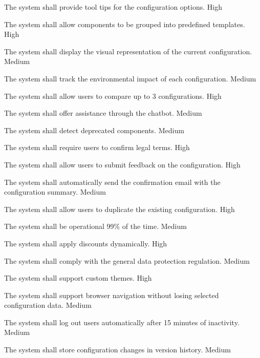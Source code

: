  {
    The system shall provide tool tips for the configuration options.
  }
  {High}

  {
    The system shall allow components to be grouped into predefined templates.
  }
  {High}

  {
    The system shall display the visual representation of the current configuration.
  }
  {Medium}

  {
    The system shall track the environmental impact of each configuration.
  }
  {Medium}

  {
    The system shall allow users to compare up to 3 configurations.
  }
  {High}

  {
    The system shall offer assistance through the chatbot.
  }
  {Medium}

  {
    The system shall detect deprecated components.
  }
  {Medium}

  {
    The system shall require users to confirm legal terms.
  }
  {High}

  {
    The system shall allow users to submit feedback on the configuration.
  }
  {High}

  {
    The system shall automatically send the confirmation email with the configuration summary.
  }
  {Medium}

  {
    The system shall allow users to duplicate the existing configuration.
  }
  {High}

  {
    The system shall be operational 99\% of the time.
  }
  {Medium}

  {
    The system shall apply discounts dynamically.
  }
  {High}

  {
    The system shall comply with the general data protection regulation.
  }
  {Medium}

  {
    The system shall support custom themes.
  }
  {High}

  {
    The system shall support browser navigation without losing selected configuration data.
  }
  {Medium}

  {
    The system shall log out users automatically after 15 minutes of inactivity.
  }
  {Medium}

  {
    The system shall store configuration changes in version history.
  }
  {Medium}


